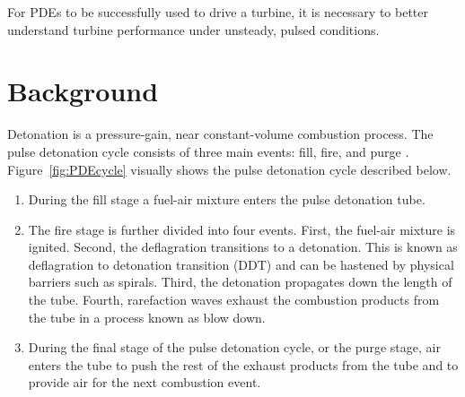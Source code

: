 \documentclass[12pt, letterpaper]{article}
\begin{document}
For PDEs to be successfully used to drive a turbine, it is necessary to better understand turbine performance under unsteady, pulsed conditions.



\section{Background}

Detonation is a pressure-gain, near constant-volume combustion process. The pulse detonation cycle consists of three main events: fill, fire, and purge \cite{Rouser2011:Performance}. Figure~\ref{fig:PDEcycle} visually shows the pulse detonation cycle described below.

\begin{enumerate}
\item During the fill stage a fuel-air mixture enters the pulse detonation tube.
\item The fire stage is further divided into four events. First, the fuel-air mixture is ignited. Second, the deflagration transitions to a detonation. This is known as deflagration to detonation transition (DDT) and can be hastened by physical barriers such as spirals. Third, the detonation propagates down the length of the tube. Fourth, rarefaction waves exhaust the combustion products from the tube in a process known as blow down.
\item During the final stage of the pulse detonation cycle, or the purge stage, air enters the tube to push the rest of the exhaust products from the tube and to provide air for the next combustion event.
\end{enumerate}
\end{document}
